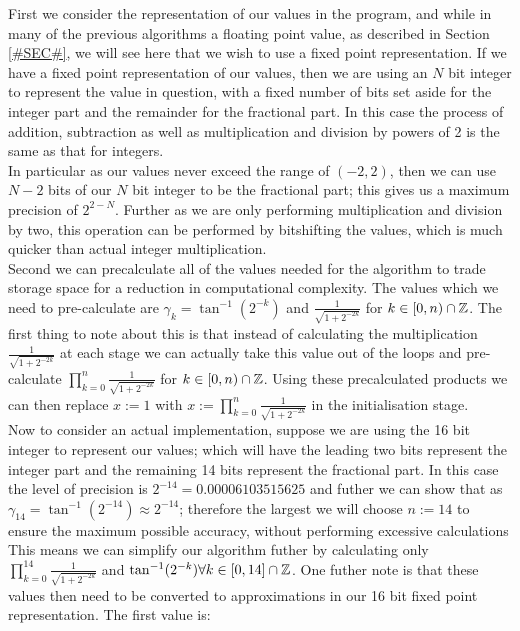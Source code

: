 {First we consider the representation of our values in the program, and while in many of the previous algorithms a floating point  value, as described in Section \ref{#SEC#}, we will see here that we wish to use a fixed point representation. If we have a fixed point representation of our values, then we are using an \(N\) bit integer to represent the value in question, with a fixed number of bits set aside for the integer part and the remainder for the fractional part. In this case the process of addition, subtraction as well as multiplication and division by powers of 2 is the same as that for integers.\\

In particular as our values never exceed the range of \((-2,2)\), then we can use \(N-2\) bits of our \(N\) bit integer to be the fractional part; this gives us a maximum precision of \(2^{2-N}\). Further as we are only performing multiplication and division by two, this operation can be performed by bitshifting the values, which is much quicker than actual integer multiplication.\\

Second we can precalculate all of the values needed for the algorithm to trade storage space for a reduction in computational complexity. The values which we need to pre-calculate are \(\gamma_k = \tan^{-1}(2^{-k})\) and \(\tfrac{1}{\sqrt{1+2^{-2k}}}\) for \(k \in [0, n) \cap \mathbb{Z}\). The first thing to note about this is that instead of calculating the multiplication \(\tfrac{1}{\sqrt{1+2^{-2k}}}\) at each stage we can actually take this value out of the loops and pre-calculate \(\prod_{k=0}^n \tfrac{1}{\sqrt{1+2^{-2k}}}\) for \(k \in [0, n) \cap \mathbb{Z}\). Using these precalculated products we can then replace \(x := 1\) with \(x := \prod_{k=0}^n \tfrac{1}{\sqrt{1+2^{-2k}}}\) in the initialisation stage.\\

Now to consider an actual implementation, suppose we are using the 16 bit integer  to represent our values; which will have the leading two bits represent the integer part and the remaining 14 bits represent the fractional part. In this case the level of precision is \(2^{-14} = 0.00006103515625\) and futher we can show that as \(\gamma_{14} = \tan^{-1}(2^{-14}) \approx 2^{-14}\); therefore the largest we will choose \(n := 14\) to ensure the maximum possible accuracy, without performing excessive calculations\\

This means we can simplify our algorithm futher by calculating only \(\prod_{k=0}^{14} \frac{1}{\sqrt{1 + 2^{-2k}}}\) and \(\tan^{-1}(2^{-k}) \forall k \in [0,14] \cap \mathbb{Z}\). One futher note is that these values then need to be converted to approximations in our 16 bit fixed point representation. The first value is: 

}
